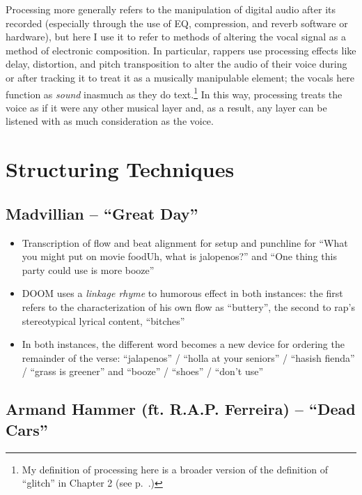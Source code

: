 Processing more generally refers to the manipulation of digital audio after its recorded (especially through
the use of EQ, compression, and reverb software or hardware), but here I use it to refer to methods of altering
the vocal signal as a method of electronic composition. In particular, rappers use processing effects like delay, 
distortion, and pitch transposition to alter the audio of their voice during or after tracking it to treat it 
as a musically manipulable element; the vocals here function as \emph{sound} inasmuch as they do text.\footnote{
    My definition of processing here is a broader version of the definition of ``glitch'' in Chapter 2 
    (see p.~\pageref{glitch}.)}
In this way, processing treats the voice as if it were any other musical layer and, as a result, any layer can
be listened with as much consideration as the voice.


\newpage
\section{Structuring Techniques}
\subsection*{\centering Madvillian -- ``Great Day''}

\begin{itemize}
    \item Transcription of flow and beat alignment for setup and punchline for ``What you might put on 
    movie food\textellipsis Uh, what is jalopenos?'' and ``One thing this party could use is more\textellipsis
    booze''
    \item DOOM uses a \emph{linkage rhyme} to humorous effect in both instances: the first refers to 
    the characterization of his own flow as ``buttery'', the second to rap's stereotypical lyrical content,
    ``bitches''
    \item In both instances, the different word becomes a new device for ordering the remainder of the 
    verse: ``jalapenos'' / ``holla at your seniors'' / ``hasish fienda'' / ``grass is greener'' and 
    ``booze'' / ``shoes'' / ``don't use''
\end{itemize}

\subsection*{\centering Armand Hammer (ft. R.A.P. Ferreira) -- ``Dead Cars''}

